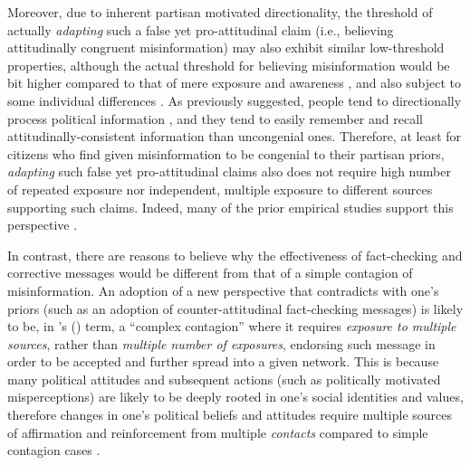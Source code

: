 \documentclass[man, 12pt, a4paper, nolmodern, noextraspace]{apa6}
\begin{document}
    Moreover, due to inherent partisan motivated directionality, the threshold of actually \emph{adapting} such a false yet pro-attitudinal claim (i.e., believing attitudinally congruent misinformation) may also exhibit similar low-threshold properties, although the actual threshold for believing misinformation would be bit higher compared to that of mere exposure and awareness \parencite[e.g.,][]{Monsted_plos2017}, and also subject to some individual differences \parencite[e.g.,][]{weeks2015emotions, flynn2017nature}. As previously suggested, people tend to directionally process political information \parencite{taber2006}, and they tend to easily remember and recall attitudinally-consistent information than uncongenial ones. Therefore, at least for citizens who find given misinformation to be congenial to their partisan priors, \emph{adapting} such false yet pro-attitudinal claims also does not require high number of repeated exposure nor independent, multiple exposure to different sources supporting such claims. Indeed, many of the prior empirical studies support this perspective \parencite[e.g.,][]{garrett2016driving, kuklinski2000misinformation, flynn2017nature}.         
    
    In contrast, there are reasons to believe why the effectiveness of fact-checking and corrective messages would be different from that of a simple contagion of misinformation. An adoption of a new perspective that contradicts with one's priors (such as an adoption of counter-attitudinal fact-checking messages) is likely to be, in \citeauthor{centola2007complex}'s (\citeyear{centola2007complex}) term, a \enquote{complex contagion} where it requires \emph{exposure to multiple sources}, rather than \emph{multiple number of exposures}, endorsing such message in order to be accepted and further spread into a given network. This is because many political attitudes and subsequent actions (such as politically motivated misperceptions) are likely to be deeply rooted in one’s social identities and values, therefore changes in one's political beliefs and attitudes require multiple sources of affirmation and reinforcement from multiple \emph{contacts} compared to simple contagion cases \parencite[e.g.,][]{gonzalez2017decoding, larson2016social, siegel2009social}. 
    
\end{document}
